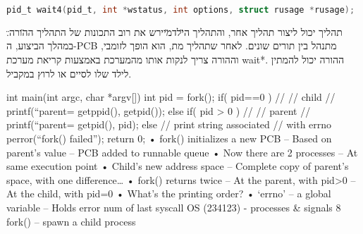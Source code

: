 \documentclass[12pt]{report}
\begin{document}
  \begin{lstlisting}[language=C]  pid_t wait4(pid_t, int *wstatus, int options, struct rusage *rusage);  \end{lstlisting}  
  \begin{tcolorbox}[colback=yellow!5, colframe=yellow!80!black, title={\faBookmark נקודות מפתח}]  תהליך יכול ליצור תהליך אחר, והתהליך ה\"ילד\" מיירש את רוב התכונות של התהליך ה\"הורה\". במהלך הביצוע, ה-PCB מתנהל בין תורים שונים. לאחר שתהליך מת, הוא הופך לזומבי, וההורה צריך לנקות אותו מהמערכת באמצעות קריאת מערכת wait*. ההורה יכול להמתין לילד שלו לסיים או לרוץ במקביל.  \end{tcolorbox}  

int main(int argc, char *argv[])
{
  int pid = fork();
  if( pid==0 ) { 
   //
   // child
      //
      printf(“parent=%
             getppid(), getpid());
  }
  else if( pid > 0 ) {
      //
      // parent
      //
      printf(“parent=%
             getpid(), pid);
  }
  else { // print string associated
         // with errno   
      perror(“fork() failed”); 
  }
  return 0;
}
• fork() initializes a new PCB
– Based on parent’s value
– PCB added to runnable queue
• Now there are 2 processes
– At same execution point
• Child’s new address space 
– Complete copy of parent’s 
space, with one difference…
• fork() returns twice
– At the parent, with pid>0
– At the child, with pid=0
• What’s the printing order?
• ‘errno’ – a global variable
– Holds error num of last syscall
OS (234123) - processes & signals
8
fork() – spawn a child process
\end{document}
